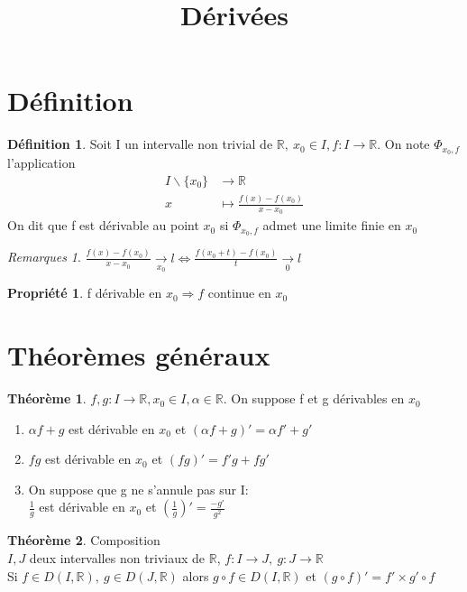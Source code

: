 \documentclass[fleqn]{article}
\title{D\'eriv\'ees}
\date{}
\theoremstyle{definition} \newtheorem*{defi}{D\'efinition}
\theoremstyle{definition} \newtheorem*{theo}{Th\'eor\`eme}
\theoremstyle{remark} \newtheorem*{rqs}{Remarques}
\theoremstyle{definition} \newtheorem*{prop}{Propri\'et\'e}
\begin{document}
\maketitle

\section{D\'efinition}
\begin{defi}
	Soit I un intervalle non trivial de $\mathbb{R},\ x_0 \in I, f:I \rightarrow \mathbb{R}$. On note $\Phi_{x_0, f}$ l'application
	\begin{align*}
		I\backslash\{x_0\} &\rightarrow \mathbb{R} \\
		x &\mapsto \frac{f(x) - f(x_0)}{x - x_0}
	\end{align*}
	On dit que f est d\'erivable au point $x_0$ si $\Phi_{x_0, f}$ admet une limite finie en $x_0$
\end{defi}

\begin{rqs}
	$\frac{f(x) - f(x_0)}{x - x_0} \underset{x_0}{\rightarrow} l \Leftrightarrow \frac{f(x_0 + t) - f(x_0)}{t} \underset{0}{\rightarrow} l$
\end{rqs}

\begin{prop}
	f d\'erivable en $x_0 \Rightarrow f$ continue en $x_0$
\end{prop}

\section{Th\'eor\`emes g\'en\'eraux}
\begin{theo}
	$f,g: I \rightarrow \mathbb{R}, x_0 \in I, \alpha \in \mathbb{R}$. On suppose f et g d\'erivables en $x_0$
	\begin{enumerate}
		\item $\alpha f + g$ est d\'erivable en $x_0$ et $(\alpha f + g)' = \alpha f' + g'$
		\item $fg$ est d\'erivable en $x_0$ et $(fg)' = f'g + fg'$
		\item On suppose que g ne s'annule pas sur I:\\
			$\frac{1}{g}$ est d\'erivable en $x_0$ et $(\frac{1}{g})' = \frac{-g'}{g^2}$
	\end{enumerate}
\end{theo}

\begin{theo} Composition\\
	$I,J$ deux intervalles non triviaux de $\mathbb{R}$, $f:I\rightarrow J,\ g:J \rightarrow \mathbb{R}$ \\
	Si $f \in D(I, \mathbb{R}),\ g \in D(J, \mathbb{R})$ alors $g\circ f \in D(I, \mathbb{R})$ et $(g\circ f)' = f' \times g'\circ f$
\end{theo}
\end{document}
